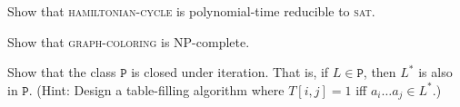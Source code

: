 \documentclass[a4paper,12pt]{amsart}
\begin{document}
\medskip
\begin{problem}

    Show that \textsc{hamiltonian-cycle} is polynomial-time reducible to \textsc{sat}.        
        
\end{problem}


\begin{problem}

    Show that \textsc{graph-coloring} is NP-complete.

    \smallskip
    \begin{center}
    \end{center}
        
\end{problem}
       

\begin{problem}

    Show that the class $\mathtt{P}$ is closed under iteration. That is, if $L\in\mathtt{P}$, then $L^*$ is also in $\mathtt{P}$. (Hint: Design a table-filling algorithm where $T[i,j]=1$ iff $a_i\dots a_j\in L^*$.)

\end{problem}
\end{document}
